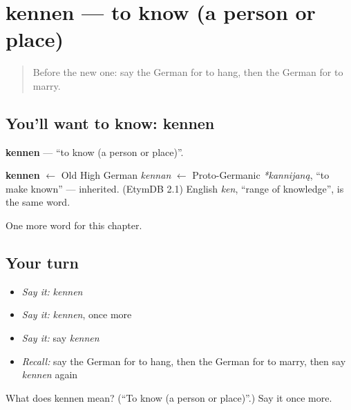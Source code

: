 \section[kennen]{kennen — to know (a person or place)}

\label{lesson:GE-C147-kennen}



\begin{quote}
Before the new one: say the German for to hang, then the German for to marry.
\end{quote}

\subsection*{You'll want to know: kennen}
\textbf{kennen} — \textquotedblleft{}to know (a person or place)\textquotedblright{}.

\begin{cousinweb}
\textbf{kennen} $\leftarrow$ Old High German \emph{kennan} $\leftarrow$ Proto-Germanic \emph{*kannijaną}, \textquotedblleft{}to make known\textquotedblright{} — inherited. (EtymDB 2.1) English \emph{ken}, \textquotedblleft{}range of knowledge\textquotedblright{}, is the same word.
\end{cousinweb}

\begin{grammarlens}[title={What you've built}]
One more word for this chapter.
\end{grammarlens}

\subsection*{Your turn}
\begin{itemize}
\raggedright
  \item \emph{Say it:} \emph{kennen}
  \item \emph{Say it:} \emph{kennen}, once more
  \item \emph{Say it:} say \emph{kennen}
  \item \emph{Recall:} say the German for to hang, then the German for to marry, then say \emph{kennen} again
\end{itemize}

\begin{tcolorbox}[breakable,colback=teal!4,colframe=teal!35!black,title={Before you move on}]
What does kennen mean? (\textquotedblleft{}To know (a person or place)\textquotedblright{}.) Say it once more.
\end{tcolorbox}
